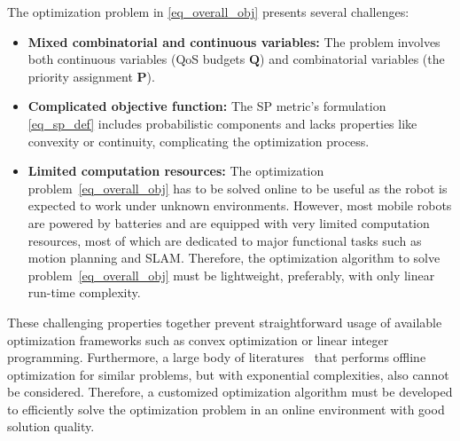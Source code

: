     The optimization problem in \eqref{eq_overall_obj} presents several challenges:
\begin{itemize}
    \item \textbf{Mixed combinatorial and continuous variables:} The problem involves both continuous variables (QoS budgets $\boldsymbol{Q}$) and combinatorial variables (the priority assignment $\boldsymbol{P}$).
    \item \textbf{Complicated objective function:} The SP metric's formulation \eqref{eq_sp_def} includes probabilistic components and lacks properties like convexity or continuity, complicating the optimization process.
    \item \textbf{Limited computation resources:} The optimization problem~\eqref{eq_overall_obj} has to be solved online to be useful as the robot is expected to work under unknown environments.
    However, most mobile robots are powered by batteries and are equipped with very limited computation resources, most of which are dedicated to major functional tasks such as motion planning and SLAM.
    Therefore, the optimization algorithm to solve problem~\eqref{eq_overall_obj} must be lightweight, preferably, with only linear run-time complexity.
\end{itemize}
    These challenging properties together prevent straightforward usage of available optimization frameworks such as convex optimization or linear integer programming.
    Furthermore, a large body of literatures~\cite{zhao2018unified, Wang2023OptimizingLET, Verucchi2020LatencyAwareGO} that performs offline optimization for similar problems, but with exponential complexities, also cannot be considered.
    Therefore, a customized optimization algorithm must be developed to efficiently solve the optimization problem in an online environment with good solution quality.

